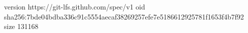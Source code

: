 version https://git-lfs.github.com/spec/v1
oid sha256:7bde04bdba336c91c5554aecaf38269257efe7e5186612925781f1653f4b7f92
size 131168
